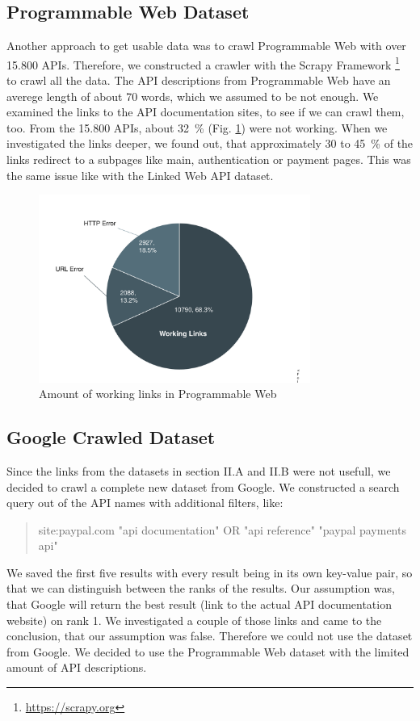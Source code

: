 \documentclass[a4paper]{IEEEtran}
\begin{document}
\subsection{Programmable Web Dataset}
Another approach to get usable data was to crawl Programmable Web with over 15.800 APIs. Therefore, we constructed a crawler with the Scrapy Framework \footnote[2]{\url{https://scrapy.org}} to crawl all the data. The API descriptions from Programmable Web have an averege length of about 70 words, which we assumed to be not enough. We examined the links to the API documentation sites, to see if we can crawl them, too. From the 15.800 APIs, about 32~\% (Fig.  \ref{fig_sim3}) were not working. When we investigated the links deeper, we found out, that approximately 30 to 45~\% of the links redirect to a subpages like  main, authentication or payment pages. This was the same issue like with the Linked Web API dataset.
\begin{figure}[h]
\centering
\includegraphics[width= 3.5in]{img/graph1.pdf}
\caption{Amount of working links in Programmable Web}
\label{fig_sim3}
\end{figure}

\subsection{Google Crawled Dataset}
Since the links from the datasets in section II.A and II.B were not usefull, we decided to crawl a complete new dataset from Google. We constructed a search query out of the API names with additional filters, like:\\

\begin{quote}
site:paypal.com "api documentation" OR "api reference" "paypal payments api"\\
\end{quote}

We saved the first five results with every result being in its own key-value pair, so that we can distinguish between the ranks of the results. Our assumption was, that Google will return the best result (link to the actual API documentation website) on rank 1. We investigated a couple of those links and came to the conclusion, that our assumption was false. Therefore we could not use the dataset from Google.
We decided to use the Programmable Web dataset with the limited amount of API descriptions.
\end{document}

